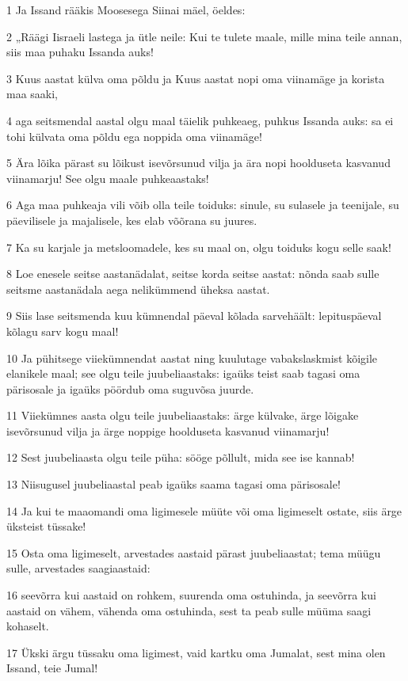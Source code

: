 \par 1 Ja Issand rääkis Moosesega Siinai mäel, öeldes:
\par 2 „Räägi Iisraeli lastega ja ütle neile: Kui te tulete maale, mille mina teile annan, siis maa puhaku Issanda auks!
\par 3 Kuus aastat külva oma põldu ja Kuus aastat nopi oma viinamäge ja korista maa saaki,
\par 4 aga seitsmendal aastal olgu maal täielik puhkeaeg, puhkus Issanda auks: sa ei tohi külvata oma põldu ega noppida oma viinamäge!
\par 5 Ära lõika pärast su lõikust isevõrsunud vilja ja ära nopi hoolduseta kasvanud viinamarju! See olgu maale puhkeaastaks!
\par 6 Aga maa puhkeaja vili võib olla teile toiduks: sinule, su sulasele ja teenijale, su päevilisele ja majalisele, kes elab võõrana su juures.
\par 7 Ka su karjale ja metsloomadele, kes su maal on, olgu toiduks kogu selle saak!
\par 8 Loe enesele seitse aastanädalat, seitse korda seitse aastat: nõnda saab sulle seitsme aastanädala aega nelikümmend üheksa aastat.
\par 9 Siis lase seitsmenda kuu kümnendal päeval kõlada sarvehäält: lepituspäeval kõlagu sarv kogu maal!
\par 10 Ja pühitsege viiekümnendat aastat ning kuulutage vabakslaskmist kõigile elanikele maal; see olgu teile juubeliaastaks: igaüks teist saab tagasi oma pärisosale ja igaüks pöördub oma suguvõsa juurde.
\par 11 Viiekümnes aasta olgu teile juubeliaastaks: ärge külvake, ärge lõigake isevõrsunud vilja ja ärge noppige hoolduseta kasvanud viinamarju!
\par 12 Sest juubeliaasta olgu teile püha: sööge põllult, mida see ise kannab!
\par 13 Niisugusel juubeliaastal peab igaüks saama tagasi oma pärisosale!
\par 14 Ja kui te maaomandi oma ligimesele müüte või oma ligimeselt ostate, siis ärge üksteist tüssake!
\par 15 Osta oma ligimeselt, arvestades aastaid pärast juubeliaastat; tema müügu sulle, arvestades saagiaastaid:
\par 16 seevõrra kui aastaid on rohkem, suurenda oma ostuhinda, ja seevõrra kui aastaid on vähem, vähenda oma ostuhinda, sest ta peab sulle müüma saagi kohaselt.
\par 17 Ükski ärgu tüssaku oma ligimest, vaid kartku oma Jumalat, sest mina olen Issand, teie Jumal!
